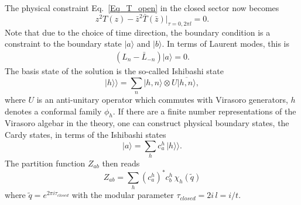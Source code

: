 \documentclass[submission, PhysLectNotes]{SciPost}
\begin{document}
The physical constraint Eq.~\ref{Eq_T_open} in the closed sector now becomes 
\begin{equation}
    z^2 T(z) - \bar{z}^2 \bar{T}(\bar{z})\vert_{\tau=0,2\pi l} = 0.
\end{equation}
Note that due to the choice of time direction, the boundary condition is a constraint to the boundary state $\vert a \rangle$ and $\vert b\rangle$. In terms of Laurent modes, this is
\begin{equation}
    \begin{split}
        \left(L_n - \bar{L}_{-n}\right) \vert a \rangle = 0.  
    \end{split}
\end{equation}
The basis state of the solution is the so-called Ishibashi state
\begin{equation}
    \vert h \rangle\rangle = \sum_n \vert h,n\rangle \otimes U\overline{\vert h,n\rangle},
\end{equation}
where $U$ is an anti-unitary operator which commutes with Virasoro generators, $h$ denotes a conformal family $\phi_h$. If there are a finite number representations of the Virasoro algebar in the theory, one can construct physical boundary states, the Cardy states, in terms of the Ishibashi states
\begin{equation}
    \vert a \rangle = \sum_h c_a^h\, \vert h \rangle \rangle. 
\end{equation}
The partition function $Z_{ab}$ then reads
\begin{equation}
    Z_{ab} = \sum_h \left(c_a^h\right)^* c_b^h\, \chi_h(\tilde{q})
\end{equation}
where $\tilde{q} = e^{2\pi i \tau_{closed}}$ with the modular parameter $\tau_{closed} = 2i\,l = i/t$.
\end{document}
